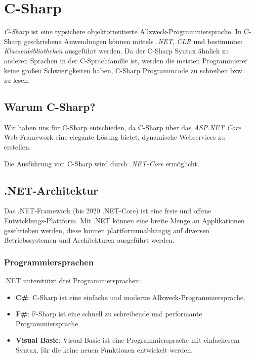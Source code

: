 \pagebreak
\section{C-Sharp}
\label{C-Sharp}

\textit{C-Sharp} ist eine typsichere objektorientierte Allzweck-Programmiersprache.
In C-Sharp geschriebene Anwendungen können mittels \textit{.NET}, \textit{CLR} und bestimmten 
\textit{Klassenbibliotheken} ausgeführt werden. 
Da der C-Sharp Syntax ähnlich zu anderen Sprachen in der C-Sprachfamilie ist, werden die meisten
Programmierer keine großen Schwierigkeiten haben, C-Sharp Programmcode zu schreiben bzw. zu lesen.  
\cite{csharpmicrosoft}

\subsection{Warum C-Sharp?}
Wir haben uns für C-Sharp entschieden, da C-Sharp über das \textit{ASP.NET Core} Web-Framework eine elegante 
Lösung bietet, dynamische Webservices zu erstellen.

Die Ausführung von C-Sharp wird durch \textit{.NET-Core} ermöglicht.

\subsection{.NET-Architektur}
Das .NET-Framework (bis 2020 .NET-Core) ist eine freie und offene Entwicklungs-Plattform. Mit .NET können eine breite Menge an
Applikationen geschrieben werden, diese können plattformunabhängig auf diversen Betriebssystemen
und Architekturen ausgeführt werden. \cite{dotnetmicrosoft} 

\subsubsection{Programmiersprachen}
.NET unterstützt drei Programmiersprachen:
\begin{itemize}
    \item \textbf{C\#}: C-Sharp ist eine einfache und moderne Allzweck-Programmiersprache.
    \item \textbf{F\#}: F-Sharp ist eine schnell zu schreibende und performante Programmiersprache.
    \item \textbf{Visual Basic}: Visual Basic ist eine Programmiersprache mit einfacherem Syntax, für die keine
    neuen Funktionen entwickelt werden.  
\end{itemize}

